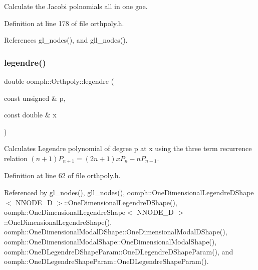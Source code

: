 Calculate the Jacobi polnomials all in one goe. 



Definition at line 178 of file orthpoly.\+h.



References gl\+\_\+nodes(), and gll\+\_\+nodes().

\mbox{\label{namespaceoomph_1_1Orthpoly_aa71411bff7bff140b78e33bebc5133c0}} 
\subsubsection{\texorpdfstring{legendre()}{legendre()}}
{\footnotesize\ttfamily double oomph\+::\+Orthpoly\+::legendre (\begin{DoxyParamCaption}\item[{const unsigned \&}]{p,  }\item[{const double \&}]{x }\end{DoxyParamCaption})\hspace{0.3cm}{\ttfamily [inline]}}



Calculates Legendre polynomial of degree p at x using the three term recurrence relation $ (n+1) P_{n+1} = (2n+1)xP_{n} - nP_{n-1} $. 



Definition at line 62 of file orthpoly.\+h.



Referenced by gl\+\_\+nodes(), gll\+\_\+nodes(), oomph\+::\+One\+Dimensional\+Legendre\+D\+Shape$<$ N\+N\+O\+D\+E\+\_\+D $>$\+::\+One\+Dimensional\+Legendre\+D\+Shape(), oomph\+::\+One\+Dimensional\+Legendre\+Shape$<$ N\+N\+O\+D\+E\+\_\+D $>$\+::\+One\+Dimensional\+Legendre\+Shape(), oomph\+::\+One\+Dimensional\+Modal\+D\+Shape\+::\+One\+Dimensional\+Modal\+D\+Shape(), oomph\+::\+One\+Dimensional\+Modal\+Shape\+::\+One\+Dimensional\+Modal\+Shape(), oomph\+::\+One\+D\+Legendre\+D\+Shape\+Param\+::\+One\+D\+Legendre\+D\+Shape\+Param(), and oomph\+::\+One\+D\+Legendre\+Shape\+Param\+::\+One\+D\+Legendre\+Shape\+Param().

\mbox{\label{namespaceoomph_1_1Orthpoly_ab6f2929f6ec8fde591799edaebc66380}} 
